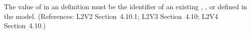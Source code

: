 The value of  in an \InitialAssignment definition must be the
identifier of an existing \Compartment, \Species, or \Parameter defined in
the model.  (References: L2V2 Section~4.10.1; L2V3
Section~4.10; L2V4 Section~4.10.)
